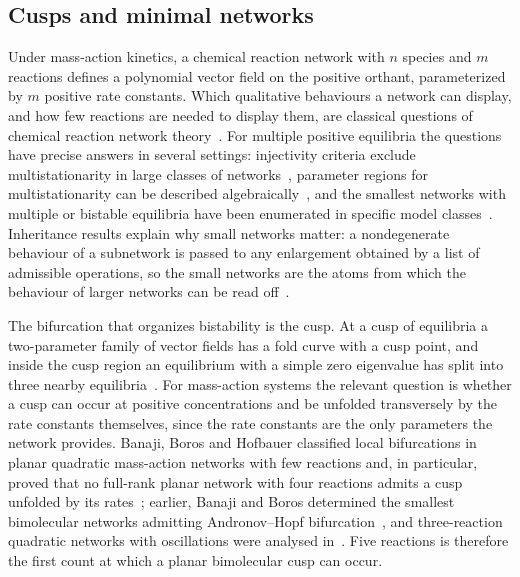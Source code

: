 \documentclass[11pt,a4paper]{article}
\theoremstyle{plain}
\theoremstyle{definition}
\theoremstyle{remark}
\numberwithin{equation}{section}
\begin{document}
\subsection{Cusps and minimal networks}
Under mass-action kinetics, a chemical reaction network with $n$ species and $m$ reactions defines a polynomial vector field on the positive orthant, parameterized by $m$ positive rate constants. Which qualitative behaviours a network can display, and how few reactions are needed to display them, are classical questions of chemical reaction network theory~\citep{Feinberg2019}. For multiple positive equilibria the questions have precise answers in several settings: injectivity criteria exclude multistationarity in large classes of networks~\citep{CF2005}, parameter regions for multistationarity can be described algebraically~\citep{CFMW2017}, and the smallest networks with multiple or bistable equilibria have been enumerated in specific model classes~\citep{Wilhelm2009,JS2013}. Inheritance results explain why small networks matter: a nondegenerate behaviour of a subnetwork is passed to any enlargement obtained by a list of admissible operations, so the small networks are the atoms from which the behaviour of larger networks can be read off~\citep{BP2018,BBH2022,BBH2025}.

The bifurcation that organizes bistability is the cusp. At a cusp of equilibria a two-parameter family of vector fields has a fold curve with a cusp point, and inside the cusp region an equilibrium with a simple zero eigenvalue has split into three nearby equilibria~\citep{Kuznetsov2004,GS1985}. For mass-action systems the relevant question is whether a cusp can occur at positive concentrations and be unfolded transversely by the rate constants themselves, since the rate constants are the only parameters the network provides. Banaji, Boros and Hofbauer classified local bifurcations in planar quadratic mass-action networks with few reactions and, in particular, proved that no full-rank planar network with four reactions admits a cusp unfolded by its rates~\citep{BBH2024}; earlier, Banaji and Boros determined the smallest bimolecular networks admitting Andronov--Hopf bifurcation~\citep{BB2023}, and three-reaction quadratic networks with oscillations were analysed in~\citep{BBH2024osc}. Five reactions is therefore the first count at which a planar bimolecular cusp can occur.
\end{document}
